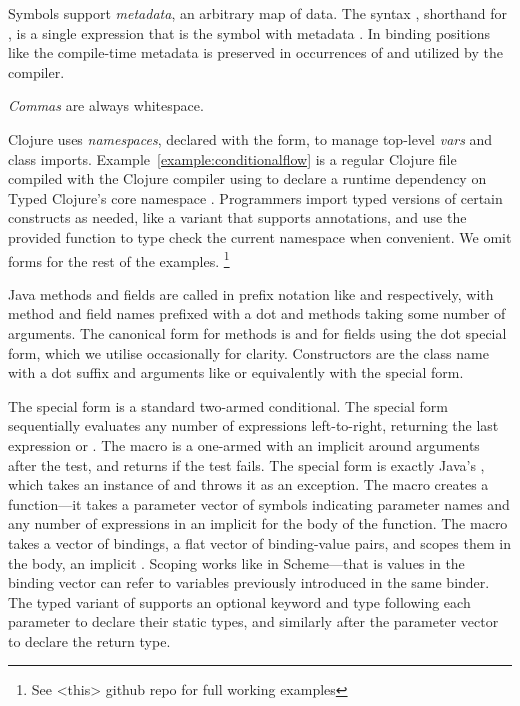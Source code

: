 Symbols support \emph{metadata}, an arbitrary map of
data. The syntax , shorthand for , is a single expression that is the symbol  
with metadata .
In binding positions like 
the compile-time metadata is preserved in occurrences of 
and utilized by the compiler.

\emph{Commas} are always whitespace.

Clojure uses \emph{namespaces}, declared with the
 form, to manage top-level \emph{vars} and
class imports.
Example~\ref{example:conditionalflow}
is a regular Clojure file compiled with
the Clojure compiler using  to declare a
runtime dependency on Typed Clojure's core namespace
.
Programmers import typed versions of certain constructs as needed, like
a  variant that supports annotations,
and use the provided  function to type check the current namespace
when convenient.
We omit  forms for the rest of the examples.
\footnote{See <this> github repo for full working examples}

Java methods and fields are called in prefix notation
like  and  respectively,
with method and field names prefixed with a dot and methods taking some number of arguments.
The canonical form for methods is  
and for fields  using the dot special form, which we utilise occasionally
for clarity.
Constructors are the class name with a dot suffix and arguments like 
or equivalently  with the  special form.

The  special form is a standard two-armed conditional.
The  special form sequentially evaluates any number of expressions
left-to-right, returning the last expression or \nil{}.
The  macro is a one-armed  with an implicit 
around arguments after the test, and returns  if the test fails.
The  special form is exactly Java's , which takes an
instance of  and throws it as an exception.
The  macro creates a function---it takes a parameter vector of symbols indicating parameter names
and any number of expressions in an implicit  for the body of the function.
The  macro takes a vector of bindings, a flat vector of binding-value pairs,
and scopes them in the body, an implicit .
Scoping works like  in Scheme---that is values in the binding vector can refer
to variables previously introduced in the same binder.
The typed
variant of  supports an optional keyword \clj{:-} and type following
each parameter to declare their static types, and similarly after
the parameter vector to declare the return type.

